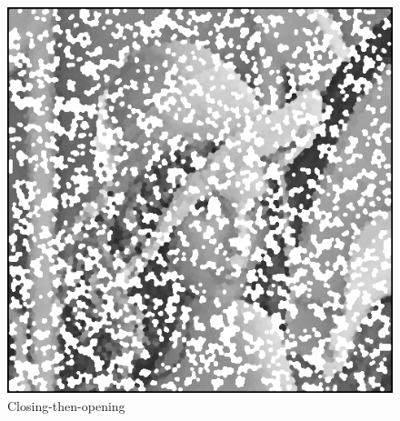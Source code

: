 \documentclass{article}
\begin{document}
\begin{figure}[H]
  \includegraphics[width=\linewidth]{img/snp10_close_then_open.png}
  \caption{Closing-then-opening}\label{fig:snp10_close_then_open}
\endminipage\hfill
\end{figure}
\end{document}
